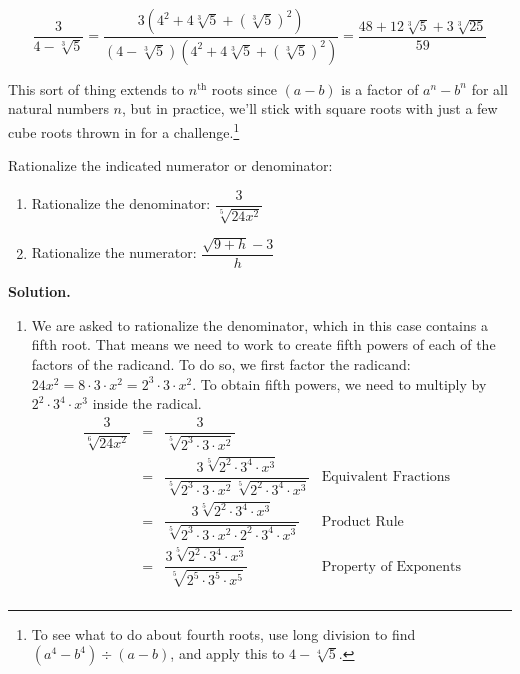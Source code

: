 \documentclass[10pt]{article}
\begin{document}
\[ \dfrac{3}{4 - \sqrt[3]{5}} = \dfrac{3(4^2 + 4\sqrt[3]{5} + (\sqrt[3]{5})^2)}{(4 - \sqrt[3]{5})(4^2 + 4\sqrt[3]{5} + (\sqrt[3]{5})^2)} = \dfrac{48 + 12\sqrt[3]{5}+ 3\sqrt[3]{25}}{59}\]

This sort of thing extends to $n^{\text{th}}$ roots since $(a-b)$ is a factor of $a^n - b^n$ for all natural numbers $n$, but in practice, we'll stick with square roots with just a few cube roots thrown in for a challenge.\footnote{To see what to do about fourth roots, use long division to find $(a^4 - b^4) \div (a-b)$, and apply this to $4 - \sqrt[4]{5}$.}

\begin{ex} \label{rationalizenumdenom} Rationalize the indicated numerator or denominator:

\begin{multicols}{2}
\begin{enumerate}

\item  Rationalize the denominator:  $\dfrac{3}{\sqrt[5]{24x^2}}$

\item  Rationalize the numerator: $\dfrac{\sqrt{9 + h} - 3}{h}$

\setcounter{HW}{\value{enumi}}

\end{enumerate}
\end{multicols}

{\bf Solution.}

\begin{enumerate}

\item We are asked to rationalize the denominator, which in this case contains a fifth root.  That means we need to work to create fifth powers of each of the factors of the radicand.  To do so, we first factor the radicand:  $24x^2 = 8 \cdot 3 \cdot x^2 = 2^3 \cdot 3 \cdot x^2$.  To obtain fifth powers, we need to multiply by $2^2 \cdot 3^4 \cdot x^3$ inside the radical.  \[ \begin{array}{rclr}

\dfrac{3}{\sqrt[6]{24x^2}} & = & \dfrac{3}{\sqrt[5]{2^3 \cdot 3 \cdot x^2}} & \\ [12pt]
                           & = & \dfrac{3 \sqrt[5]{2^2 \cdot 3^4 \cdot x^3}}{\sqrt[5]{2^3 \cdot 3 \cdot x^2}\sqrt[5]{2^2 \cdot 3^4 \cdot x^3}} & \text{Equivalent Fractions} \\[12pt]
												& = & \dfrac{3 \sqrt[5]{2^2 \cdot 3^4 \cdot x^3}}{\sqrt[5]{2^3 \cdot 3 \cdot x^2 \cdot 2^2 \cdot 3^4 \cdot x^3}} & \text{Product Rule} \\[12pt]
													& = & \dfrac{3 \sqrt[5]{2^2 \cdot 3^4 \cdot x^3}}{\sqrt[5]{2^5 \cdot 3^5 \cdot x^5}} & \text{Property of Exponents}\\[12pt]
													

\end{array}\]
\end{enumerate}
\end{ex}
\end{document}
